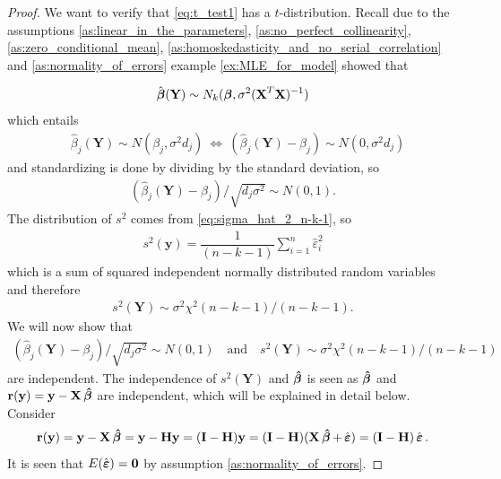 \begin{proof}
We want to verify that \eqref{eq:t_test1} has a $t$-distribution. Recall due to the assumptions \ref{as:linear_in_the_parameters}, \ref{as:no_perfect_collinearity}, \ref{as:zero_conditional_mean}, \ref{as:homoskedasticity_and_no_serial_correlation} and \ref{as:normality_of_errors} example \ref{ex:MLE_for_model} showed that

\begin{align} \label{eq:th_t_test}
    \hat{\operatorname{\boldsymbol{\beta}}}(\textbf{Y}) \sim N_k(\operatorname{\boldsymbol{\beta}},\sigma^2(\textbf{X}^T\textbf{X})^{-1})
\end{align}
which entails
\begin{align*}
    &\hat{\beta}_j(\textbf{Y})\sim N(\beta_j , \sigma^2d_j) \
    \Leftrightarrow \  (\hat{\beta}_j(\textbf{Y})-\beta_j) \sim N(0,\sigma^2d_j)
\end{align*}
and standardizing is done by dividing by the standard deviation, so
\begin{align*}
    (\hat{\beta}_j(\textbf{Y})-\beta_j)/\sqrt{d_j\sigma^2} \sim N(0,1).
\end{align*}
The distribution of $s^2$ comes from \eqref{eq:sigma_hat_2_n-k-1}, so
\begin{align} \label{eq:sigma_square_of_Y}
    s^2(\textbf{y}) = \dfrac{1}{(n-k-1)}\sum_{i=1}^n \hat{\varepsilon}_i^2
\end{align}
which is a sum of squared independent normally distributed random variables and therefore
\begin{align*}
s^2(\textbf{Y}) \sim \sigma^2 \chi^2(n-k-1)/(n-k-1).    
\end{align*}
We will now show that
\begin{align*}
    (\hat{\beta}_j(\textbf{Y})-\beta_j)/\sqrt{d_j\sigma^2} \sim N(0,1) \quad \text{and} \quad s^2(\textbf{Y}) \sim \sigma^2\chi^2 (n-k-1)/(n-k-1)
\end{align*}
are independent.
The independence of $s^2(\textbf{Y})$ and $\operatorname{\boldsymbol{\hat{\beta}}}$ is seen as $\operatorname{\boldsymbol{\hat{\beta}}}$ and $\textbf{r}(\textbf{y}) = \textbf{y} -\textbf{X} \operatorname{\boldsymbol{\hat{\beta}}}$ are independent, which will be explained in detail below.
Consider
\begin{align*}
    \textbf{r}(\textbf{y}) = \textbf{y}-\textbf{X} \operatorname{\boldsymbol{\hat{\beta}}} = \textbf{y} - \textbf{H} \textbf{y} = (\textbf{I}-\textbf{H})\textbf{y} = (\textbf{I}-\textbf{H}) (\textbf{X} \operatorname{\boldsymbol{\hat{\beta}}} + \operatorname{\hat{\boldsymbol{\varepsilon}}}) = (\textbf{I} - \textbf{H}) \operatorname{\hat{\boldsymbol{\varepsilon}}}.
\end{align*}
It is seen that $E(\operatorname{\hat{\boldsymbol{\varepsilon}}}) = \textbf{0}$ by assumption \ref{as:normality_of_errors}. 

\end{proof}
